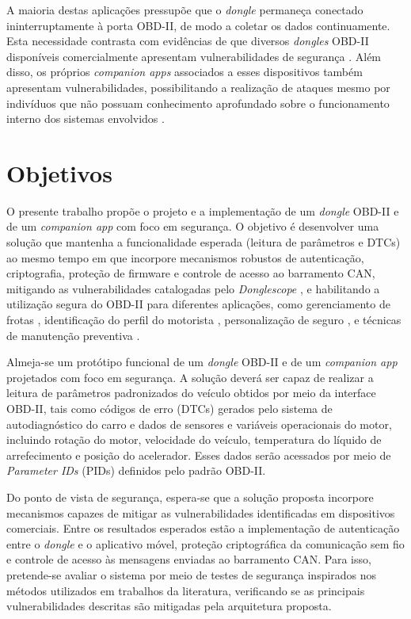 A maioria destas aplicações pressupõe que o \textit{dongle} permaneça conectado ininterruptamente à porta OBD-II, de modo a coletar os dados continuamente. Esta necessidade contrasta com evidências de que diversos \textit{dongles} OBD-II disponíveis comercialmente apresentam vulnerabilidades de segurança \cite{wen2020plugnpwned}. Além disso, os próprios \textit{companion apps} associados a esses dispositivos também apresentam vulnerabilidades, possibilitando a realização de ataques mesmo por indivíduos que não possuam conhecimento aprofundado sobre o funcionamento interno dos sistemas envolvidos \cite{companionapps2024security}.

\section{Objetivos} \label{sec:intro-objs}

O presente trabalho propõe o projeto e a implementação de um \textit{dongle} OBD-II e de
um \textit{companion app} com foco em segurança. O objetivo é desenvolver uma solução
que mantenha a funcionalidade esperada (leitura de parâmetros e DTCs) ao mesmo
tempo em que incorpore mecanismos robustos de autenticação, criptografia, proteção de
firmware e controle de acesso ao barramento CAN, mitigando as vulnerabilidades
catalogadas pelo \textit{Donglescope} \cite{wen2020plugnpwned}, e habilitando a utilização segura
do OBD-II para diferentes aplicações, como gerenciamento de frotas \cite{malekian2017fleet}, identificação do perfil do motorista \cite{barreto2018perfis}, personalização de seguro \cite{michailidis2025mlobd}, e técnicas de manutenção preventiva  \cite{errezgouny2025predictive}.

Almeja-se um protótipo funcional de um \textit{dongle} OBD-II e de um \textit{companion app} projetados com foco em segurança. A solução deverá ser capaz de realizar a leitura de parâmetros padronizados do veículo obtidos por meio da interface OBD-II, tais como códigos de erro (DTCs) gerados pelo sistema de autodiagnóstico do carro e dados de sensores e variáveis operacionais do motor, incluindo rotação do motor, velocidade do veículo, temperatura do líquido de arrefecimento e posição do acelerador. Esses dados serão acessados por meio de \textit{Parameter IDs} (PIDs) definidos pelo padrão OBD-II. 

Do ponto de vista de segurança, espera-se que a solução proposta incorpore mecanismos capazes de mitigar as vulnerabilidades identificadas em dispositivos comerciais. Entre os resultados esperados estão a implementação de autenticação entre o \textit{dongle} e o aplicativo móvel, proteção criptográfica da comunicação sem fio e controle de acesso às mensagens enviadas ao barramento CAN. Para isso, pretende-se avaliar o sistema por meio de testes de segurança inspirados nos métodos utilizados em trabalhos da literatura, verificando se as principais vulnerabilidades descritas são mitigadas pela arquitetura proposta.

